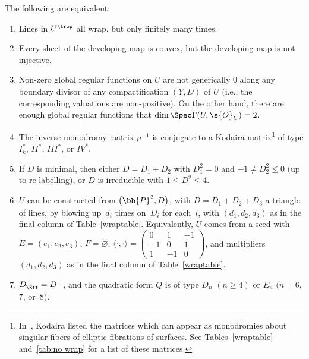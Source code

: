 \begin{thm}\label{all-wrap}
The following are equivalent:
\begin{enumerate}\itemsep=0pt	
 \item[$1.$] {Lines} in $U^{\trop}$ all wrap, but only finitely many times. %
 \item[$2.$] Every sheet of the {developing map} is convex, but the developing map is not injective. %
 \item[$3.$] Non-zero global regular {functions} on $U$ are not generically $0$ along any boundary divisor of any compactification $(Y,D)$ of $U$ $($i.e., the corresponding valuations are non-positive$)$. On the other hand, there are enough global regular functions that $\dim \Spec \Gamma(U,\s{O}_U)=2$.%
 \item[$4.$] The inverse {monodromy matrix} $\mu^{-1}$ is conjugate to a Kodaira matrix\footnote{In~\cite{Kod}, Kodaira listed the matrices which can appear as monodromies about singular fibers of elliptic fibrations of surfaces. See Tables~\ref{wraptable} and~\ref{tab:no wrap} for a list of these matrices.} of type $I_k^*$, $II^*$, $III^*$, or $IV^*$. %
 \item[$5.$] If $D$ is minimal, then either $D=D_1+D_2$ with $D_1^2 = 0$ and $-1\neq D_2^2 \leq 0$ $($up to re-labelling$)$, or $D$ is irreducible with $1\leq D^2 \leq 4$. 	%
 \item[$6.$] $U$ can be constructed from $\big(\bb{P}^2,D\big)$, with $D=D_1+D_2+D_3$ a triangle of lines, by blowing up~$d_i$ times on~$D_i$ for each~$i$, with $(d_1,d_2,d_3)$ as in the final column of Table~{\rm \ref{wraptable}}. Equivalently, $U$ comes from a seed with $E=(e_1,e_2,e_3)$, $F=\varnothing$, $\langle \cdot , \cdot \rangle = 	\left(\begin{smallmatrix}
		0 &1 &-1 \\
	 -1 &0 &1 \\
	 1 &-1 &0
		\end{smallmatrix}\right)$, and multipliers $(d_1,d_2,d_3)$ as in the final column of Table~{\rm \ref{wraptable}}.
\item[$7.$] $D^{\perp}_{\Eff}=D^{\perp}$, and the {quadratic form} $Q$ is of type $D_n$ $(n\geq 4)$ or $E_n$ $(n=6$, $7$, or~$8)$. %
\end{enumerate}
\end{thm}

